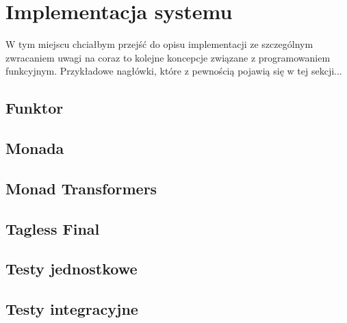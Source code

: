\documentclass[../main.tex]{subfiles}
\begin{document}
\section{Implementacja systemu}
W tym miejscu chciałbym przejść do opisu implementacji ze szczególnym zwracaniem uwagi na coraz to kolejne koncepcje związane z programowaniem funkcyjnym.\newline\vspace{7ex}
Przykładowe nagłówki, które z pewnością pojawią się w tej sekcji...

\subsection{Funktor}
\subsection{Monada}
\subsection{Monad Transformers}
\subsection{Tagless Final}

\subsection{Testy jednostkowe}
\subsection{Testy integracyjne}
\end{document}
